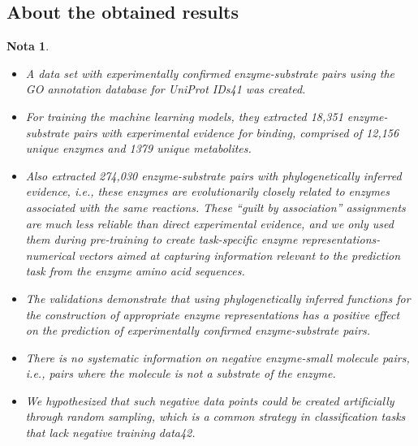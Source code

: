 \documentclass[12pt]{article}
\newtheorem{Note}{Nota}%
\begin{document}
\subsection{About the obtained results}

\begin{Note}
\begin{itemize}


\item A data set with experimentally conﬁrmed enzyme-substrate
pairs using the GO annotation database for UniProt IDs41  was created.

\item For training the machine learning models, they extracted 18,351 enzyme-substrate pairs with experimental evidence for binding, comprised of 12,156 unique enzymes and 1379 unique metabolites. 

\item Also extracted 274,030 enzyme-substrate pairs with phylogenetically inferred evidence, i.e., these enzymes are evolutionarily closely related to enzymes associated with the same reactions. These “guilt by association” assignments are much less reliable than direct experimental evidence, and we only used them during pre-training to create task-speciﬁc enzyme representations-numerical vectors aimed at capturing information relevant to the prediction task from the enzyme amino acid sequences. 

\item The validations demonstrate that using phylogenetically inferred functions for the construction of appropriate enzyme representations has a positive effect on the prediction of experimentally conﬁrmed enzyme-substrate pairs.

\item There is no systematic information on negative enzyme-small molecule pairs, i.e., pairs where the molecule is not a substrate of the enzyme.

\item We hypothesized that such negative data points could be created artiﬁcially through random sampling, which is a common strategy in classiﬁcation tasks that lack negative training data42.




\end{itemize}
\end{Note}
\end{document}
